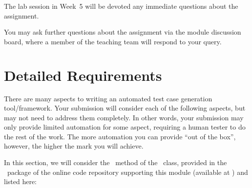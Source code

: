 The lab session in Week~5 will be devoted any immediate questions about the
assignment. 

You may ask further questions about the assignment via the module discussion
board, where a member of the teaching team will respond to your query.


\section{Detailed Requirements}
\label{sec:requirements}

There are many aspects to writing an automated test case generation
tool/framework. Your submission will consider each of the following aspects, but
may not need to address them completely. In other words, your submission may
only provide limited automation for some aspect, requiring a human tester to do
the rest of the work. The more automation you can provide ``out of the box'',
however, the higher the mark you will achieve. 

In this section, we will consider the \calculatemethod~method of the
\bmicalculatorclass~class, provided in the \practicalspackage~package of the
online code repository supporting this module (available at \coderepourl) and
listed here:

